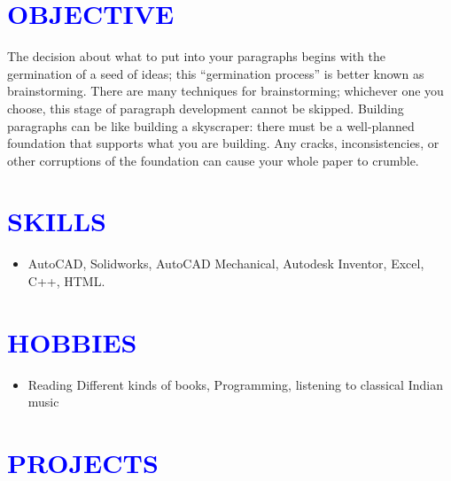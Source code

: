 \documentclass{article}
\begin{document}
\section*{\large{\textcolor{blue}{\uppercase{objective}}}}

\vspace{4pt}
The decision about what to put into your paragraphs begins with the germination of a seed of ideas; this “germination process” is better known as brainstorming. There are many techniques for brainstorming; whichever one you choose, this stage of paragraph development cannot be skipped. Building paragraphs can be like building a skyscraper: there must be a well-planned foundation that supports what you are building. Any cracks, inconsistencies, or other corruptions of the foundation can cause your whole paper to crumble.
\vspace{3pt}

\section*{\large{\textcolor{blue}{\uppercase{Skills}}}}

\vspace{4pt}
\begin{itemize}[noitemsep,nolistsep]
	\item AutoCAD, Solidworks, AutoCAD Mechanical, Autodesk Inventor, Excel, C++, HTML.
\end{itemize}
\vspace{3pt}

\section*{\large{\textcolor{blue}{\uppercase{Hobbies}}}}

\vspace{4pt}
\begin{itemize}[noitemsep,nolistsep]
	\item Reading Different kinds of books, Programming, listening to classical Indian music
\end{itemize}

\vspace{3pt}
\section*{\large{\textcolor{blue}{\uppercase{projects}}}}
\end{document}

